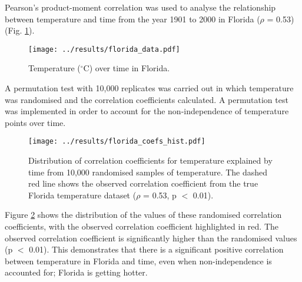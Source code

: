 \documentclass[12pt]{article}
\title{\vspace{-1.5em}{Is Florida getting warmer?\vspace{-2em}}}
\date{}
\author{}
\begin{document}
    \maketitle

    \thispagestyle{fancy}

    Pearson's product-moment correlation was used to analyse the relationship between temperature and time from the year 1901 to 2000 in Florida ($\rho$ = 0.53) (Fig. \ref{fig:florida_data}).
    
    \begin{figure}[h!]
        \centering
        \texttt{[image: ../results/florida\_data.pdf]}
        \caption{Temperature ($^{\circ}$C) over time in Florida.}
        \label{fig:florida_data}
    \end{figure}

    A permutation test with 10,000 replicates was carried out in which temperature was randomised and the correlation coefficients calculated. A permutation test was implemented in order to account for the non-independence of temperature points over time.

    \begin{figure}[h!]
        \centering
        \texttt{[image: ../results/florida\_coefs\_hist.pdf]}
        \caption{Distribution of correlation coefficients for temperature explained by time from 10,000 randomised samples of temperature. The dashed red line shows the observed correlation coefficient from the true Florida temperature dataset ($\rho$ = 0.53, p $<$ 0.01).}
        \label{fig:coefs_hist}
    \end{figure}

    Figure \ref{fig:coefs_hist} shows the distribution of the values of these randomised correlation coefficients, with the observed correlation coefficient highlighted in red. The observed correlation coefficient is significantly higher than the randomised values (p $<$ 0.01). This demonstrates that there is a significant positive correlation between temperature in Florida and time, even when non-independence is accounted for; Florida is getting hotter.
\end{document}
